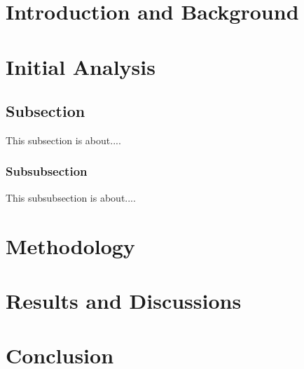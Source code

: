 \documentclass[12pt, a4paper]{article}
\title{\mytitle}
\author{\myauthor\hspace{1em}\\\contact\\\hspace{0.5em}\hspace{0.5em}\mymodule}
\date{}
\begin{document}
    \maketitle   
    \newpage

    \begin{abstract}    
        The aim of this report is to...
    \end{abstract}

    \section{Introduction and Background}   

    \section{Initial Analysis}        
    \subsection{Subsection}
    This subsection is about.... \cite{williams2012c++}
    \subsubsection{Subsubsection}
    This subsubsection is about....
    
    \section{Methodology}       

    \section{Results and Discussions}    

    \section{Conclusion}

    
    		
    

\end{document}
